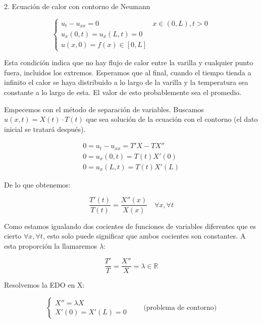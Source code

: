 	\begin{example}{2. Ecuación de calor con contorno de Neumann}

		\[
		\begin{cases}
		u_t - u_{xx} = 0 & x \in (0,L), t > 0 \\
		u_x(0,t) = u_x(L,t) = 0 \\
		u(x,0) = f(x) \in [0,L]
		\end{cases}
		\]

		Esta condición indica que no hay flujo de calor entre la varilla y cualquier punto fuera, incluidos los extremos. Esperamos que al final, cuando el tiempo tienda a infinito el calor se haya distribuido a lo largo de la varilla y la temperatura sea constante a lo largo de esta. El valor de esto probablemente sea el promedio.

		\begin{figure}[thbp]
		\centering
		\caption{}
		\label{fig:transmisionCalorNeumann}
		\end{figure}

		Empecemos con el método de separación de variables. Buscamos $u(x,t) = X(t) \cdot T(t)$ que sea solución de la ecuación con el contorno (el dato inicial se tratará después).


		\[
		\begin{array}{l}
			0 = u_t - u_{xx} = T' X - T X'' \\
			0 = u_x (0,t) = T(t) X'(0) \\
			0 = u_x (L,t) = T(t) X'(L)
		\end{array}
		\]

		De lo que obtenemos:

		\[ \frac{T'(t)}{T(t)} = \frac{X''(x)}{X(x)} \quad \forall x, \forall t \]

		Como estamos igualando dos cocientes de funciones de variables diferentes que es cierto $\forall x, \forall t$, esto solo puede significar que ambos cocientes son constantes. A esta proporción la llamaremos $\lambda$:

		\[ \frac{T'}{T} = \frac{X''}{X} = \lambda \in \mathbb{R} \]

		Resolvemos la EDO en X:

		\[
		\left\{ \begin{array}{l}
		X'' = \lambda X \\
		X'(0) = X'(L) = 0
		\end{array} \right. \quad\quad \text{(problema de contorno)}
		\]


\end{example}
